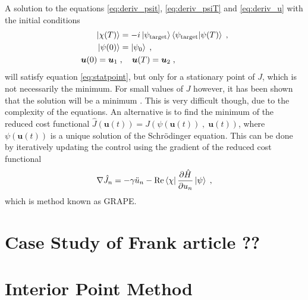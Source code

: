 A solution to the equations \ref{eq:deriv_psit}, \ref{eq:deriv_psiT} and \ref{eq:deriv_u} with the initial conditions
\begin{align}
	\ket{\chi (T)} &= -i \ket{\psi_{\mathrm{target}}} \braket{\psi_{\mathrm{target}} | \psi (T)} \; , \\
	\ket{\psi (0)} &= \ket{\psi _0} \; , \\
	\boldsymbol{u}(0) = \boldsymbol{u}_1 \; &, \quad \boldsymbol{u}(T) = \boldsymbol{u}_2 \; ,
\end{align}
will satisfy equation \ref{eq:statpoint}, but only for a stationary point of $J$, which is not necessarily the minimum. For small values of $J$ however, it has been shown that the solution will be a minimum \cite{BECcontrol}. This is very difficult though, due to the complexity of the equations. An alternative is to find the minimum of the reduced cost functional $\hat{J}\left( \boldsymbol{u}(t) \right) =  J\left(\psi(\boldsymbol{u}(t)) \; , \; \boldsymbol{u}(t) \right)$, where $\psi(\boldsymbol{u}(t))$ is a unique solution of the Schrödinger equation. This can be done by iteratively updating the control using the gradient of the reduced cost functional
\begin{equation}
	\nabla \hat{J}_n = - \gamma \ddot{u}_n - \Re \bra{\chi} \pdv{\hat{H}}{u_n} \ket{\psi} \; ,
\end{equation}
which is method known as GRAPE. 

\section{Case Study of Frank article ??}

\section{Interior Point Method}

